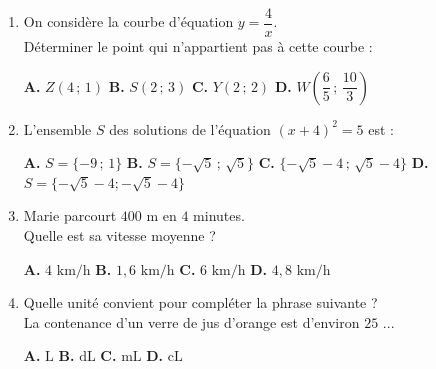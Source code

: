 \documentclass[a4paper,11pt]{article}
\begin{document}
\begin{seanceD}{}
\begin{enumerate}
\begin{multicols}{2}
\begin{tikzpicture}[baseline,scale = 0.5]
\end{tikzpicture}
    \end{multicols}
\medskip
\begin{center}
\textbf{\textcolor{Couleur1}{A.}} Le point $A$ est situé en dessous de la droite $(D)$ \qquad \textbf{\textcolor{Couleur1}{B.}} Le point $A$ appartient à la droite $(D)$ \qquad \textbf{\textcolor{Couleur1}{C.}} Le point $A$ est situé au-dessus de la droite $(D)$ \qquad \textbf{\textcolor{Couleur1}{D.}} On ne peut pas déterminer la position de $A$ par rapport à la droite $(D)$
\end{center}


\item On considère la courbe d'équation $y=\dfrac{4}{x}$. \\
    Déterminer le point qui n'appartient pas à cette courbe :

\medskip
\begin{center}
\textbf{\textcolor{Couleur1}{A.}} $Z(4\,;\,1)$ \qquad \textbf{\textcolor{Couleur1}{B.}} $S(2\,;\,3)$ \qquad \textbf{\textcolor{Couleur1}{C.}} $Y(2\,;\,2)$ \qquad \textbf{\textcolor{Couleur1}{D.}} $W\left(\dfrac{6}{5}\,;\,\dfrac{10}{3}\right)$
\end{center}


\item L'ensemble $S$ des solutions de l'équation  $(x+4)^2=5$ est :

\medskip
\begin{center}
\textbf{\textcolor{Couleur1}{A.}} $S=\{-9\,;\,1\}$ \qquad \textbf{\textcolor{Couleur1}{B.}} $S=\{-\sqrt{5}\,;\,\sqrt{5}\}$ \qquad \textbf{\textcolor{Couleur1}{C.}} $\{-\sqrt{5}-4\,;\,\sqrt{5}-4\}$ \qquad \textbf{\textcolor{Couleur1}{D.}} $S=\{-\sqrt{5}-4;-\sqrt{5}-4\}$
\end{center}


\item Marie parcourt $400\text{ m}$ en $4$ minutes. \\Quelle est sa vitesse moyenne ?

\medskip
\begin{center}
\textbf{\textcolor{Couleur1}{A.}} $4\text{ km/h}$ \qquad \textbf{\textcolor{Couleur1}{B.}} $1{,}6\text{ km/h}$ \qquad \textbf{\textcolor{Couleur1}{C.}} $6\text{ km/h}$ \qquad \textbf{\textcolor{Couleur1}{D.}} $4{,}8\text{ km/h}$
\end{center}


\item Quelle unité convient pour compléter la phrase suivante ?\\La contenance d'un verre de jus d'orange est d'environ $25$ ...

\medskip
\begin{center}
\textbf{\textcolor{Couleur1}{A.}} $\text{L}$ \qquad \textbf{\textcolor{Couleur1}{B.}} $\text{dL}$ \qquad \textbf{\textcolor{Couleur1}{C.}} $\text{mL}$ \qquad \textbf{\textcolor{Couleur1}{D.}} $\text{cL}$
\end{center}


\end{enumerate}

\end{seanceD}
\end{document}
